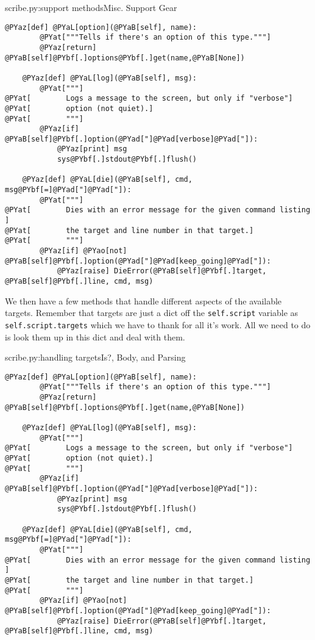 \begin{code}{scribe.py:support methods}{Misc. Support Gear}
\begin{Verbatim}[commandchars=@\[\]]
    @PYaz[def] @PYaL[option](@PYaB[self], name):
        @PYat["""Tells if there's an option of this type."""]
        @PYaz[return] @PYaB[self]@PYbf[.]options@PYbf[.]get(name,@PYaB[None])

    @PYaz[def] @PYaL[log](@PYaB[self], msg):
        @PYat["""]
@PYat[        Logs a message to the screen, but only if "verbose"]
@PYat[        option (not quiet).]
@PYat[        """]
        @PYaz[if] @PYaB[self]@PYbf[.]option(@PYad["]@PYad[verbose]@PYad["]): 
            @PYaz[print] msg
            sys@PYbf[.]stdout@PYbf[.]flush()

    @PYaz[def] @PYaL[die](@PYaB[self], cmd, msg@PYbf[=]@PYad["]@PYad["]):
        @PYat["""]
@PYat[        Dies with an error message for the given command listing ]
@PYat[        the target and line number in that target.]
@PYat[        """]
        @PYaz[if] @PYao[not] @PYaB[self]@PYbf[.]option(@PYad["]@PYad[keep_going]@PYad["]):
            @PYaz[raise] DieError(@PYaB[self]@PYbf[.]target, @PYaB[self]@PYbf[.]line, cmd, msg)
\end{Verbatim}

\end{code}

We then have a few methods that handle different aspects of the available
targets.  Remember that targets are just a dict off the \verb|self.script|
variable as \verb|self.script.targets| which we have  to thank for
all it's work.  All we need to do is look them up in this dict and deal with
them.

\begin{code}{scribe.py:handling targets}{Is?, Body, and Parsing}
\begin{Verbatim}[commandchars=@\[\]]
    @PYaz[def] @PYaL[option](@PYaB[self], name):
        @PYat["""Tells if there's an option of this type."""]
        @PYaz[return] @PYaB[self]@PYbf[.]options@PYbf[.]get(name,@PYaB[None])

    @PYaz[def] @PYaL[log](@PYaB[self], msg):
        @PYat["""]
@PYat[        Logs a message to the screen, but only if "verbose"]
@PYat[        option (not quiet).]
@PYat[        """]
        @PYaz[if] @PYaB[self]@PYbf[.]option(@PYad["]@PYad[verbose]@PYad["]): 
            @PYaz[print] msg
            sys@PYbf[.]stdout@PYbf[.]flush()

    @PYaz[def] @PYaL[die](@PYaB[self], cmd, msg@PYbf[=]@PYad["]@PYad["]):
        @PYat["""]
@PYat[        Dies with an error message for the given command listing ]
@PYat[        the target and line number in that target.]
@PYat[        """]
        @PYaz[if] @PYao[not] @PYaB[self]@PYbf[.]option(@PYad["]@PYad[keep_going]@PYad["]):
            @PYaz[raise] DieError(@PYaB[self]@PYbf[.]target, @PYaB[self]@PYbf[.]line, cmd, msg)
\end{Verbatim}

\end{code}

